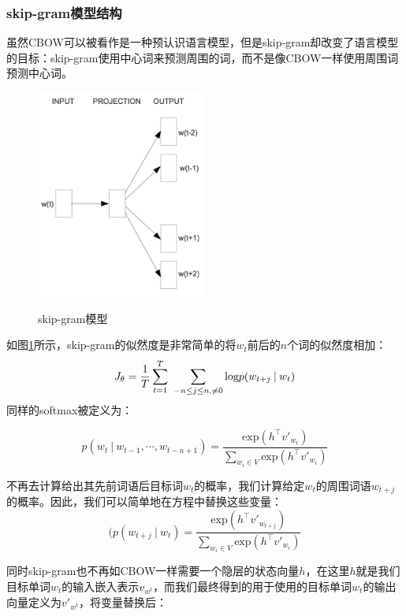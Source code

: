 \subsubsection{skip-gram模型结构}
虽然CBOW可以被看作是一种预认识语言模型，但是skip-gram却改变了语言模型的目标：skip-gram使用中心词来预测周围的词，而不是像CBOW一样使用周围词预测中心词。
   \begin{figure}[h]
\centering
  \includegraphics[width=0.5\textwidth]{./graph/skip-gram.png}\\
  \caption{skip-gram模型\cite{word2vec}}\label{fig:skip}
\end{figure} 
如图\ref{fig:skip}所示，skip-gram的似然度是非常简单的将$w_t$前后的$n$个词的似然度相加：
\begin{equation}
J_\theta = \frac{1}{T}\sum\limits_{t=1}^T\ \sum\limits_{-n \leq j \leq n , \neq 0} \text{log} \space p(w_{t+j} \: | \: w_t)
\end{equation}
同样的softmax被定义为：

\begin{equation}
p(w_t \: | \: w_{t-1} , \cdots , w_{t-n+1}) = \dfrac{\text{exp}({h^\top v'_{w_t}})}{\sum_{w_i \in V} \text{exp}({h^\top v'_{w_i}})} 	
\end{equation}

不再去计算给出其先前词语后目标词$w_t$的概率，我们计算给定$w_t$的周围词语$w_{t + j}$的概率。因此，我们可以简单地在方程中替换这些变量：
\begin{equation}
(p(w_{t+j} \: | \: w_t ) = \dfrac{\text{exp}({h^\top v'_{w_{t+j}}})}{\sum_{w_i \in V} \text{exp}({h^\top v'_{w_i}})}	
\end{equation}

同时skip-gram也不再如CBOW一样需要一个隐层的状态向量$h$，在这里$h$就是我们目标单词$w_t$的输入嵌入表示$v_{w^t}$，而我们最终得到的用于使用的目标单词$w_t$的输出向量定义为$v'_{w^t}$，将变量替换后：

